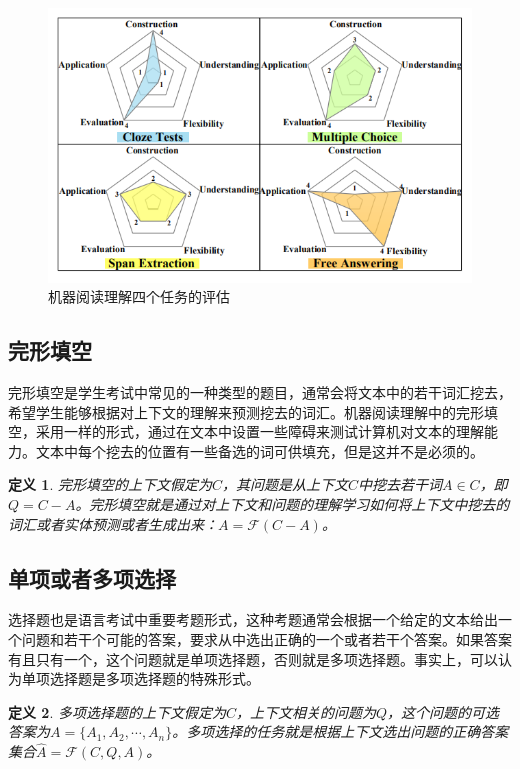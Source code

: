 \documentclass[twoside,a4paper,12pt]{book}%
\newtheorem{definition}{定义}
\begin{document}
\begin{figure}[htbp]
\begin{center}
\includegraphics[width=5.6in]{figures/mrc2.png}
\caption{机器阅读理解四个任务的评估}
\label{fig:mrc2}
\end{center}
\end{figure}
\subsection{完形填空}
完形填空是学生考试中常见的一种类型的题目，通常会将文本中的若干词汇挖去，希望学生能够根据对上下文的理解来预测挖去的词汇。机器阅读理解中的完形填空，采用一样的形式，通过在文本中设置一些障碍来测试计算机对文本的理解能力。文本中每个挖去的位置有一些备选的词可供填充，但是这并不是必须的。
\begin{definition}
完形填空的上下文假定为$C$，其问题是从上下文$C$中挖去若干词$A\in C$，即$Q=C-A$。完形填空就是通过对上下文和问题的理解学习如何将上下文中挖去的词汇或者实体预测或者生成出来：$A=\mathcal{F}(C-{A})$。
\end{definition}
\subsection{单项或者多项选择}
选择题也是语言考试中重要考题形式，这种考题通常会根据一个给定的文本给出一个问题和若干个可能的答案，要求从中选出正确的一个或者若干个答案。如果答案有且只有一个，这个问题就是单项选择题，否则就是多项选择题。事实上，可以认为单项选择题是多项选择题的特殊形式。
\begin{definition}
多项选择题的上下文假定为$C$，上下文相关的问题为$Q$，这个问题的可选答案为$A=\{A_1,A_2,\cdots,A_n\}$。多项选择的任务就是根据上下文选出问题的正确答案集合$\hat{A} =\mathcal{F}(C,Q,A)$。
\end{definition}
\end{document}
